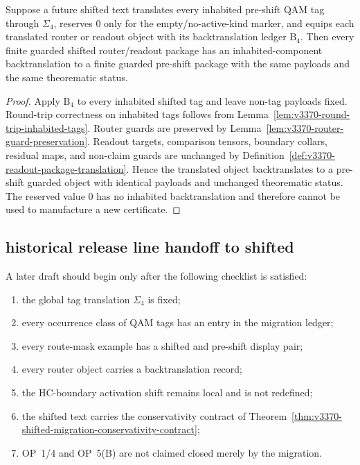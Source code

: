 \begin{theorem}
\label{thm:v3370-shifted-migration-conservativity-contract}
Suppose a future shifted text translates every inhabited pre-shift QAM tag through
$\Sigma_{4}$, reserves $0$ only for the empty/no-active-kind marker, and equips
each translated router or readout object with its backtranslation ledger
$\mathrm{B}_{4}$. Then every finite guarded shifted router/readout package has an
inhabited-component backtranslation to a finite guarded pre-shift package with the
same payloads and the same theorematic status.
\end{theorem}

\begin{proof}
Apply $\mathrm{B}_{4}$ to every inhabited shifted tag and leave non-tag payloads fixed.
Round-trip correctness on inhabited tags follows from
Lemma~\ref{lem:v3370-round-trip-inhabited-tags}. Router guards are preserved
by Lemma~\ref{lem:v3370-router-guard-preservation}. Readout targets,
comparison tensors, boundary collars, residual maps, and non-claim guards are
unchanged by Definition~\ref{def:v3370-readout-package-translation}. Hence
the translated object backtranslates to a pre-shift guarded object with identical
payloads and unchanged theorematic status. The reserved value $0$ has no
inhabited backtranslation and therefore cannot be used to manufacture a new
certificate.
\end{proof}

\subsection{historical release line handoff to shifted}
\label{subsec:v3370-handoff-to-shifted}

\begin{definition}
\label{def:v3370-shifted-entry-checklist}
A later  draft should begin only after the following checklist is
satisfied:
\begin{enumerate}[leftmargin=*]
 \item the global tag translation $\Sigma_{4}$ is fixed;
 \item every occurrence class of QAM tags has an entry in the migration ledger;
 \item every route-mask example has a shifted and pre-shift display pair;
 \item every router object carries a backtranslation record;
 \item the HC-boundary activation shift remains local and is not redefined;
 \item the shifted text carries the conservativity contract of
 Theorem~\ref{thm:v3370-shifted-migration-conservativity-contract};
 \item OP~1/4 and OP~5(B) are not claimed closed merely by the migration.
\end{enumerate}
\end{definition}

